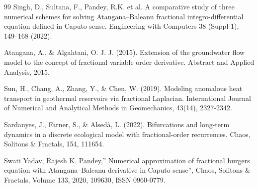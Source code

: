 \documentclass[10pt]{NSP1}
\begin{document}
\begin{thebibliography}{99}
Singh, D., Sultana, F., Pandey, R.K. et al. A comparative study of three numerical schemes for solving Atangana–Baleanu fractional integro-differential equation defined in Caputo sense. Engineering with Computers 38 (Suppl 1), 149–168 (2022).

Atangana, A., \& Algahtani, O. J. J. (2015). Extension of the groundwater flow model to the concept of fractional variable order derivative. Abstract and Applied Analysis, 2015.

Sun, H., Chang, A., Zhang, Y., \& Chen, W. (2019). Modeling anomalous heat transport in geothermal reservoirs via fractional Laplacian. International Journal of Numerical and Analytical Methods in Geomechanics, 43(14), 2327-2342.

Sardanyes, J., Farner, S., \& Alsedà, L. (2022). Bifurcations and long-term dynamics in a discrete ecological model with fractional-order recurrences. Chaos, Solitons \& Fractals, 154, 111654.

Swati Yadav, Rajesh K. Pandey,” Numerical approximation of fractional burgers equation with Atangana–Baleanu derivative in Caputo sense”, Chaos, Solitons \& Fractals, Volume 133, 2020, 109630, ISSN 0960-0779.

\end{thebibliography}
\end{document}
